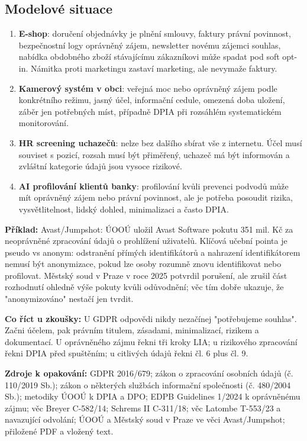 \documentclass[11pt,a4paper]{article}
\newcommand{\zkouska}[1]{\begin{tcolorbox}[breakable,enhanced,colback=blue!7,colframe=blue!30!black,boxrule=0pt,arc=1mm,left=5pt,right=5pt,top=5pt,bottom=5pt,before skip=6pt,after skip=6pt]\textbf{Co říct u zkoušky:} #1\end{tcolorbox}}
\newcommand{\priklad}[1]{\begin{tcolorbox}[breakable,enhanced,colback=green!7,colframe=green!30!black,boxrule=0pt,arc=1mm,left=5pt,right=5pt,top=5pt,bottom=5pt,before skip=6pt,after skip=6pt]\textbf{Příklad:} #1\end{tcolorbox}}
\newcommand{\zdroje}[1]{\medskip\noindent\textbf{Zdroje k opakování:} #1\medskip}
\begin{document}
\subsection*{Modelové situace}
\begin{enumerate}
  \item \textbf{E-shop}: doručení objednávky je plnění smlouvy, faktury právní povinnost, bezpečnostní logy oprávněný zájem, newsletter novému zájemci souhlas, nabídka obdobného zboží stávajícímu zákazníkovi může spadat pod soft opt-in. Námitka proti marketingu zastaví marketing, ale nevymaže faktury.
  \item \textbf{Kamerový systém v obci}: veřejná moc nebo oprávněný zájem podle konkrétního režimu, jasný účel, informační cedule, omezená doba uložení, záběr jen potřebných míst, případně DPIA při rozsáhlém systematickém monitorování.
  \item \textbf{HR screening uchazečů}: nelze bez dalšího sbírat vše z internetu. Účel musí souviset s pozicí, rozsah musí být přiměřený, uchazeč má být informován a zvláštní kategorie údajů jsou vysoce rizikové.
  \item \textbf{AI profilování klientů banky}: profilování kvůli prevenci podvodů může mít oprávněný zájem nebo právní povinnost, ale je potřeba posoudit rizika, vysvětlitelnost, lidský dohled, minimalizaci a často DPIA.
\end{enumerate}

\priklad{Avast/Jumpshot: ÚOOÚ uložil Avast Software pokutu 351 mil. Kč za neoprávněné zpracování údajů o prohlížení uživatelů. Klíčová učební pointa je pseudo vs anonym: odstranění přímých identifikátorů a nahrazení identifikátorem nemusí být anonymizace, pokud lze osoby rozumně znovu identifikovat nebo profilovat. Městský soud v Praze v roce 2025 potvrdil porušení, ale zrušil část rozhodnutí ohledně výše pokuty kvůli odůvodnění; věc tím dobře ukazuje, že "anonymizováno" nestačí jen tvrdit.}

\zkouska{U GDPR odpovědi nikdy nezačínej "potřebujeme souhlas". Začni účelem, pak právním titulem, zásadami, minimalizací, rizikem a dokumentací. U oprávněného zájmu řekni tři kroky LIA; u rizikového zpracování řekni DPIA před spuštěním; u citlivých údajů řekni čl. 6 plus čl. 9.}

\zdroje{GDPR 2016/679; zákon o zpracování osobních údajů (č. 110/2019 Sb.); zákon o některých službách informační společnosti (č. 480/2004 Sb.); metodiky ÚOOÚ k DPIA a DPO; EDPB Guidelines 1/2024 k oprávněnému zájmu; věc Breyer C-582/14; Schrems II C-311/18; věc Latombe T-553/23 a navazující odvolání; ÚOOÚ a Městský soud v Praze ve věci Avast/Jumpshot; přiložené PDF a vložený text.}
\end{document}
